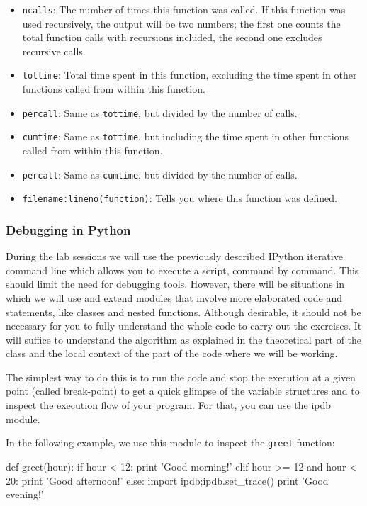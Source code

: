 \begin{itemize}
\item \texttt{ncalls}: The number of times this function was called. If this function was used recursively, the output will be two numbers; the first one counts the total function calls with recursions included, the second one excludes recursive calls.
\item \texttt{tottime}: Total time spent in this function, excluding the time spent in other functions called from within this function.
\item \texttt{percall}: Same as \texttt{tottime}, but divided by the number of calls.
\item \texttt{cumtime}: Same as \texttt{tottime}, but including the time spent in other functions called from within this function.
\item \texttt{percall}: Same as \texttt{cumtime}, but divided by the number of calls.
\item \texttt{filename:lineno(function)}: Tells you where this function was defined.
\end{itemize}

\subsubsection{Debugging in Python}

During the lab sessions we will use the previously described IPython iterative command line which allows you to execute a script, command by command. This should limit the need for debugging tools. However, there will be situations in which we will use and extend modules that involve more elaborated code and statements, like classes and nested functions. Although desirable, it should not be necessary for you to fully understand the whole code to carry out the exercises. It will suffice to understand the algorithm as explained in the theoretical part of the class and the local context of the part of the code where we will be working. 

The simplest way to do this is to run the code and stop the execution at a given point (called break-point) to get a quick glimpse of the variable structures and to inspect the execution flow of your program. For that, you can use the ipdb module. 

In the following example, we use this module to inspect the \texttt{greet} function:

\begin{python}
def greet(hour):
    if hour < 12:
        print 'Good morning!'
    elif hour >= 12 and hour < 20:
        print 'Good afternoon!'
    else:
        import ipdb;ipdb.set_trace()
        print 'Good evening!'
\end{python}

